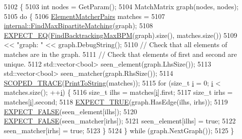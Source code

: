 \begin{DoxyCode}
5102                                   \{
5103   \textcolor{keywordtype}{int} nodes = GetParam();
5104   MatchMatrix graph(nodes, nodes);
5105   \textcolor{keywordflow}{do} \{
5106     \hyperlink{namespacetesting_1_1internal_a0038618710c01a71150887dc7cfb0a29}{ElementMatcherPairs} matches =
5107         \hyperlink{namespacetesting_1_1internal_ae30bd8357c179334b2b09b0d689efccc}{internal::FindMaxBipartiteMatching}(graph);
5108     \hyperlink{gtest_8h_a4159019abda84f5366acdb7604ff220a}{EXPECT\_EQ}(\hyperlink{namespacetesting_1_1gmock__matchers__test_a09321a8d4a4c40ab1e369fbdf92b0414}{FindBacktrackingMaxBPM}(graph).size(), matches.size())
5109         << \textcolor{stringliteral}{"graph: "} << graph.DebugString();
5110     \textcolor{comment}{// Check that all elements of matches are in the graph.}
5111     \textcolor{comment}{// Check that elements of first and second are unique.}
5112     std::vector<bool> seen\_element(graph.LhsSize());
5113     std::vector<bool> seen\_matcher(graph.RhsSize());
5114     \hyperlink{gtest_8h_a4dac08f15adc8cb1ee0e5c1bfb0f440d}{SCOPED\_TRACE}(\hyperlink{namespacetesting_aa5717bb1144edd1d262d310ba70c82ed}{PrintToString}(matches));
5115     \textcolor{keywordflow}{for} (\textcolor{keywordtype}{size\_t} \hyperlink{gtest__output__test__golden__lin_8txt_a7e98b8a17c0aad30ba64d47b74e2a6c1}{i} = 0; \hyperlink{gtest__output__test__golden__lin_8txt_a7e98b8a17c0aad30ba64d47b74e2a6c1}{i} < matches.size(); ++\hyperlink{gtest__output__test__golden__lin_8txt_a7e98b8a17c0aad30ba64d47b74e2a6c1}{i}) \{
5116       \textcolor{keywordtype}{size\_t} ilhs = matches[\hyperlink{gtest__output__test__golden__lin_8txt_a7e98b8a17c0aad30ba64d47b74e2a6c1}{i}].first;
5117       \textcolor{keywordtype}{size\_t} irhs = matches[\hyperlink{gtest__output__test__golden__lin_8txt_a7e98b8a17c0aad30ba64d47b74e2a6c1}{i}].second;
5118       \hyperlink{gtest_8h_ac33e7cdfb5d44a7a0f0ab552eb5c3c6a}{EXPECT\_TRUE}(graph.HasEdge(ilhs, irhs));
5119       \hyperlink{gtest_8h_aeb6c7ae89f440c90c1a1815951c836da}{EXPECT\_FALSE}(seen\_element[ilhs]);
5120       \hyperlink{gtest_8h_aeb6c7ae89f440c90c1a1815951c836da}{EXPECT\_FALSE}(seen\_matcher[irhs]);
5121       seen\_element[ilhs] = \textcolor{keyword}{true};
5122       seen\_matcher[irhs] = \textcolor{keyword}{true};
5123     \}
5124   \} \textcolor{keywordflow}{while} (graph.NextGraph());
5125 \}
\end{DoxyCode}

